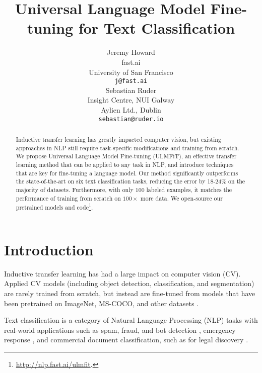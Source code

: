 \documentclass[11pt,a4paper]{article}
\title{Universal Language Model Fine-tuning for Text Classification}
\author{Jeremy Howard\footnotemark \\
  fast.ai \\
  University of San Francisco\\
  {\tt j@fast.ai} \\\And
  Sebastian Ruder\footnotemark[1] \\
  Insight Centre, NUI Galway \\
  Aylien Ltd., Dublin \\
  {\tt sebastian@ruder.io} \\}
\date{}
\begin{document}
\maketitle 
\begin{abstract}
Inductive transfer learning has greatly impacted computer vision, but existing approaches in NLP still require task-specific modifications and training from scratch. We propose Universal Language Model Fine-tuning (ULMFiT), an effective transfer learning method that can be applied to any task in NLP, and introduce techniques that are key for fine-tuning a language model. Our method significantly outperforms the state-of-the-art on six text classification tasks, reducing the error by 18-24\% on the majority of datasets. Furthermore, with only $100$ labeled examples, it matches the performance of training from scratch on $100\times$ more data. We open-source our pretrained models and code\footnote{\url{http://nlp.fast.ai/ulmfit}.}.
\end{abstract}

\newenvironment{starfootnotes}
  {\par\edef\savedfootnotenumber{\number\value{footnote}}
   \renewcommand{\thefootnote}{$\star$} 
   \setcounter{footnote}{0}}
  {\par\setcounter{footnote}{\savedfootnotenumber}}

\begin{starfootnotes}
\end{starfootnotes}

\section{Introduction}

Inductive transfer learning has had a large impact on computer vision (CV). Applied CV models (including object detection, classification, and segmentation) are rarely trained from scratch, but instead are fine-tuned from models that have been pretrained on ImageNet, MS-COCO, and other datasets \cite{sharif2014cnn,long2015fully,He2015,Huang2017}.

Text classification is a category of Natural Language Processing (NLP) tasks with real-world applications such as spam, fraud, and bot detection \cite{jindal2007review,ngai2011application,chu2012detecting}, emergency response \cite{caragea2011classifying}, and commercial document classification, such as for legal discovery \cite{roitblat2010document}.
\end{document}
